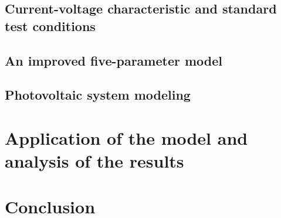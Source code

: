 \documentclass[german,a4paper,12pt,oneside]{article}
\begin{document}
\subsection{Current-voltage characteristic and standard test conditions}
\label{sec:I-V characteristic curve}

\subsection{An improved five-parameter model}

\label{sec:Five_parameter_model}
\subsection{Photovoltaic system modeling}

\label{sec:Photovoltaic_system_modeling}
\newpage

\section{Application of the model and analysis of the results}
\label{sec:Application and analysis of the model}

\newpage

\section{Conclusion}
\label{sec:Conclusion}

\newpage

{\footnotesize\listoffigures}
\newpage

{\footnotesize\listoftables}
\newpage


\setlength{\nomitemsep}{0.5pt}{\footnotesize\printnomenclature} %
\newpage

{\footnotesize{}}
\end{document}
